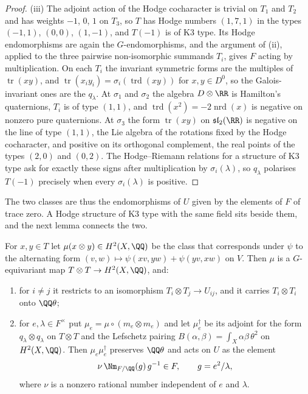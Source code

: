 \begin{proof}
(iii) The adjoint action of the Hodge cocharacter is trivial on $T_{1}$ and
$T_{2}$ and has weights $-1$, $0$, $1$ on $T_{3}$, so $T$ has Hodge numbers
$(1,7,1)$ in the types $(-1,1)$, $(0,0)$, $(1,-1)$, and $T(-1)$ is of K3
type. Its Hodge endomorphisms are again the $G$-endomorphisms, and the
argument of (ii), applied to the three pairwise non-isomorphic summands
$T_{i}$, gives $F$ acting by multiplication. On each $T_{i}$ the invariant
symmetric forms are the multiples of $\operatorname{tr}(xy)$, and
$\operatorname{tr}(x_{i}y_{i})=\sigma_{i}(\operatorname{trd}(xy))$ for
$x,y\in D^{0}$, so the Galois-invariant ones are the $q_{\lambda}$. At
$\sigma_{1}$ and $\sigma_{2}$ the algebra $D\otimes\RR$ is Hamilton's
quaternions, $T_{i}$ is of type $(1,1)$, and
$\operatorname{trd}(x^{2})=-2\operatorname{nrd}(x)$ is negative on nonzero
pure quaternions. At $\sigma_{3}$ the form
$\operatorname{tr}(xy)$ on $\mathfrak{sl}_{2}(\RR)$ is negative on the line of
type $(1,1)$, the Lie algebra of the rotations fixed by the Hodge
cocharacter, and positive on its orthogonal complement, the real points of
the types $(2,0)$ and $(0,2)$. The Hodge--Riemann relations for a structure
of K3 type ask for exactly these signs after multiplication by
$\sigma_{i}(\lambda)$, so $q_{\lambda}$ polarises $T(-1)$ precisely when every
$\sigma_{i}(\lambda)$ is positive.
\end{proof}

The two classes are thus the endomorphisms of $U$ given by the elements of
$F$ of trace zero. A Hodge structure of K3 type with the same field sits
beside them, and the next lemma connects the two.

\begin{lemma}\label{lem:mumfordmu}
For $x,y\in T$ let $\mu(x\otimes y)\in H^{2}(X,\QQ)$ be the class that
corresponds under $\psi$ to the alternating form
$(v,w)\mapsto\psi(xv,yw)+\psi(yv,xw)$ on $V$. Then $\mu$ is a $G$-equivariant
map $T\otimes T\to H^{2}(X,\QQ)$, and:
\begin{enumerate}[label=\textup{(\roman*)},nosep,leftmargin=2.6em]
\item for $i\ne j$ it restricts to an isomorphism $T_{i}\otimes T_{j}\to
  U_{ij}$, and it carries $T_{i}\otimes T_{i}$ onto $\QQ\theta$;
\item for $e,\lambda\in F^{\times}$ put $\mu_{e}=\mu\circ(m_{e}\otimes m_{e})$
  and let $\mu_{e}^{\dagger}$ be its adjoint for the form
  $q_{\lambda}\otimes q_{\lambda}$ on $T\otimes T$ and the Lefschetz pairing
  $B(\alpha,\beta)=\int_{X}\alpha\beta\,\theta^{2}$ on $H^{2}(X,\QQ)$. Then
  $\mu_{e}\mu_{e}^{\dagger}$ preserves $\QQ\theta$ and acts on $U$ as the
  element
  \[
    \nu\,\Nm_{F/\QQ}(g)\,g^{-1}\in F,\qquad g=e^{2}/\lambda,
  \]
  where $\nu$ is a nonzero rational number independent of $e$ and $\lambda$.
\end{enumerate}
\end{lemma}

